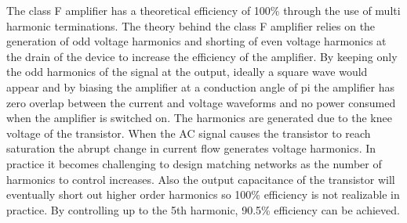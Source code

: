 The class F amplifier has a theoretical efficiency of 100\% through the use of multi harmonic terminations. The theory behind the class F amplifier relies on the generation of odd voltage harmonics and shorting of even voltage harmonics at the drain of the device to increase the efficiency of the amplifier. By keeping only the odd harmonics of the signal at the output, ideally a square wave would appear and by biasing the amplifier at a conduction angle of pi the amplifier has zero overlap between the current and voltage waveforms and no power consumed when the amplifier is switched on.
The harmonics are generated due to the knee voltage of the transistor. When the AC signal causes the transistor to reach saturation the abrupt change in current flow generates voltage harmonics. In practice it becomes challenging to design matching networks as the number of harmonics to control increases. Also the output capacitance of the transistor will eventually short out higher order harmonics so 100\% efficiency is not realizable in practice. By controlling up to the 5th harmonic, 90.5\% efficiency can be achieved.

